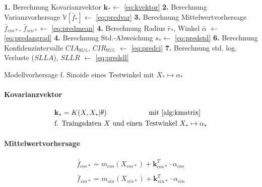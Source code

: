 \begin{algorithm}[htp]
	\SetAlgoLined
	\textbf{1.} Berechnung Kovarianzvektor $\mathbf{k}_* \leftarrow$ \autoref{eq:kvektor}\;
	\textbf{2.} Berechnung Varianzvorhersage $\mathbb{V}\left[ \bar{f}_* \right] \leftarrow$ \autoref{eq:predvar}\;
	\textbf{3.} Berechnung Mittelwertvorhersage $\bar{f}_{cos*}$, $\bar{f}_{sin*} \leftarrow$ \autoref{eq:predmean}\;
	\textbf{4.} Berechnung Radius $\bar{r}_*$, Winkel $\bar{\alpha}$ $\leftarrow$ \autoref{eq:predangrad}\;
	\textbf{4.} Berechnung Std.-Abweichung $s_* \leftarrow$ \autoref{eq:predstd}\;
	\textbf{6.} Berechnung Konfidenzintervalle $CIA_{95\%}$, $CIR_{95\%}$ $\leftarrow$ \autoref{eq:predci}\;
	\textbf{7.} Berechnung std. log. Verluste ($SLLA$), $SLLR$ $\leftarrow$ \autoref{eq:predsll}
	\caption{Modellvorhersage f. Sinoide eines Testwinkel mit $X_* \mapsto \alpha_*$}
	\label{alg:gprvorhersage}
\end{algorithm}


\paragraph*{Kovarianzvektor}

\begin{align}\label{eq:kvektor}
	& \mathbf{k}_* =  K(X, X_* | \theta) \qquad\qquad\qquad \text{mit } \text{\autoref{alg:kmatrix}} \\
	& \text{f. Traingsdaten } X \text{ und } \text{einen Testwinkel } X_* \mapsto \alpha_* \nonumber
\end{align}


\paragraph*{Mittelwertvorhersage}


\begin{align}\label{eq:predmean}
	\bar{f}_{cos*} = m_{cos}(X_{cos*}) + \mathbf{k}_{cos*}^T \cdot \alpha_{cos} \nonumber \\
	\\
	\bar{f}_{sin*} = m_{sin}(X_{sin*}) + \mathbf{k}_{sin*}^T \cdot \alpha_{sin} \nonumber
\end{align}


